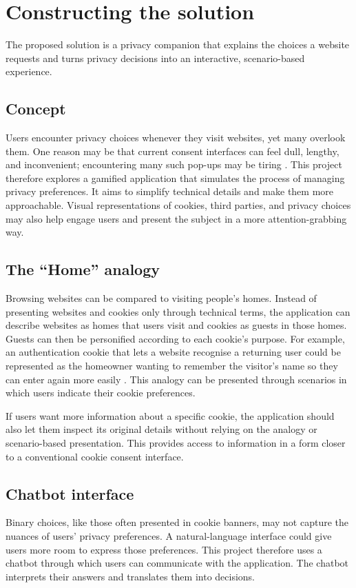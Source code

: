 \documentclass[11pt,a4paper]{report}
\begin{document}
\section{Constructing the solution}
The proposed solution is a privacy companion that explains the choices a website requests and turns privacy decisions into an interactive, scenario-based experience.
\subsection{Concept}
Users encounter privacy choices whenever they visit websites, yet many overlook them. One reason may be that current consent interfaces can feel dull, lengthy, and inconvenient; encountering many such pop-ups may be tiring \cite{Safna2025-ng}. This project therefore explores a gamified application that simulates the process of managing privacy preferences. It aims to simplify technical details and make them more approachable. Visual representations of cookies, third parties, and privacy choices may also help engage users and present the subject in a more attention-grabbing way.
\subsection{The ``Home'' analogy}
\label{subsec:analogy}
Browsing websites can be compared to visiting people's homes. Instead of presenting websites and cookies only through technical terms, the application can describe websites as homes that users visit and cookies as guests in those homes. Guests can then be personified according to each cookie's purpose. For example, an authentication cookie that lets a website recognise a returning user could be represented as the homeowner wanting to remember the visitor's name so they can enter again more easily \cite{noauthor_undated-qc}. This analogy can be presented through scenarios in which users indicate their cookie preferences.

If users want more information about a specific cookie, the application should also let them inspect its original details without relying on the analogy or scenario-based presentation. This provides access to information in a form closer to a conventional cookie consent interface.
\subsection{Chatbot interface}
Binary choices, like those often presented in cookie banners, may not capture the nuances of users' privacy preferences. A natural-language interface could give users more room to express those preferences. This project therefore uses a chatbot through which users can communicate with the application. The chatbot interprets their answers and translates them into decisions.
\end{document}
